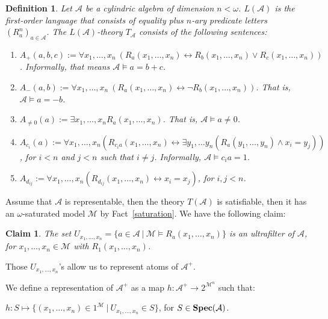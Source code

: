 \documentclass{article}
\theoremstyle{defin}
\newtheorem{definition}{Definition}
\theoremstyle{theorem}
\theoremstyle{claim}
\newtheorem{claim}{Claim}
\theoremstyle{prop}
\theoremstyle{lemma}
\theoremstyle{fact}
\theoremstyle{remark}
\theoremstyle{ex}
\theoremstyle{col}
\theoremstyle{question}
\begin{document}
\begin{definition} \label{theory} Let $\mathcal{A}$ be a cylindric algebra of dimension $n < \omega$.
$L(\mathcal{A})$ is the first-order language that consists of equality plus $n$-ary predicate letters $(R^n_a)_{a \in \mathcal{A}}$. The $L(\mathcal{A})$-theory $T_{\mathcal{A}}$ consists of the following sentences:
\begin{enumerate}
\item $A_+(a,b,c) := \forall x_1, \dots, x_n \: (R_a(x_1, \dots, x_n) \leftrightarrow R_b(x_1, \dots, x_n) \lor R_c(x_1, \dots, x_n))$. Informally, that means $\mathcal{A} \models a = b + c$.
\item $A_{-}(a,b) := \forall x_1, \dots, x_n \: (R_a(x_1, \dots, x_n) \leftrightarrow \neg R_b(x_1, \dots, x_n))$. That is, $\mathcal{A} \models a = - b$.
\item $A_{\neq 0}(a) := \exists x_1, \dots, x_n R_a(x_1, \dots, x_n)$. That is, $\mathcal{A} \models a \neq 0$.
\item $A_{c_i}(a) := \forall x_1, \dots, x_n (R_{c_i a}(x_1, \dots, x_n) \leftrightarrow \exists y_1, \dots y_n (R_a(y_1, \dots, y_n) \land x_i = y_j))$, for $i < n$ and $j < n$ such that $i \neq j$. Informally, $\mathcal{A} \models {c_i} a = 1$.
\item $A_{d_{ij}} := \forall x_1, \dots, x_n (R_{d_{ij}}(x_1, \dots, x_n) \leftrightarrow x_i = x_j)$, for $i, j < n$.
\end{enumerate}
\end{definition}

Assume that $\mathcal{A}$ is representable, then the theory $T(\mathcal{A})$ is satisfiable,
then it has an $\omega$-saturated model $\mathcal{M}$ by Fact~\ref{saturation}. We have the following claim:
\begin{claim}
The set $U_{x_1,\dots,x_n} = \{ a \in \mathcal{A} \: | \: \mathcal{M} \models R_a(x_1,\dots,x_n)\}$
is an ultrafilter of $\mathcal{A}$, for $x_1,\dots,x_n \in \mathcal{M}$ with $R_{1}(x_1,\dots,x_n)$.
\end{claim}
Those $U_{x_1,\dots,x_n}$'s allow us to represent atoms of $\mathcal{A}^{+}$.

We define a representation of $\mathcal{A}^{+}$ as a map $h : \mathcal{A}^{+} \to 2^{\mathcal{M}^n}$ such that:
\begin{center}
$h : S \mapsto \{ (x_1, \dots, x_n) \in 1^{\mathcal{M}} \: | \: U_{x_1,\dots,x_n} \in S \}$, for $S \in {\bf Spec}(\mathcal{A})$.
\end{center}
\end{document}

